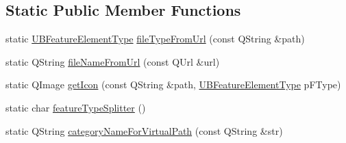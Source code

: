 \subsection*{Static Public Member Functions}
\begin{DoxyCompactItemize}
\item 
static \hyperlink{_u_b_features_controller_8h_a1ae525bf6101c0de35195259d4a6674f}{U\-B\-Feature\-Element\-Type} \hyperlink{class_u_b_features_controller_a37995e9bde0b05ca141651d80b0e9be2}{file\-Type\-From\-Url} (const Q\-String \&path)
\item 
static Q\-String \hyperlink{class_u_b_features_controller_a8592ae0251869b74f510efa3a8a9b457}{file\-Name\-From\-Url} (const Q\-Url \&url)
\item 
static Q\-Image \hyperlink{class_u_b_features_controller_a321bfa51fce6d90a82e1eba0c37ac205}{get\-Icon} (const Q\-String \&path, \hyperlink{_u_b_features_controller_8h_a1ae525bf6101c0de35195259d4a6674f}{U\-B\-Feature\-Element\-Type} p\-F\-Type)
\item 
static char \hyperlink{class_u_b_features_controller_aac526ad1696be6d863c074c057bbe371}{feature\-Type\-Splitter} ()
\item 
static Q\-String \hyperlink{class_u_b_features_controller_a1e422d46b7fbfda1ccc53dd371205b72}{category\-Name\-For\-Virtual\-Path} (const Q\-String \&str)
\end{DoxyCompactItemize}
